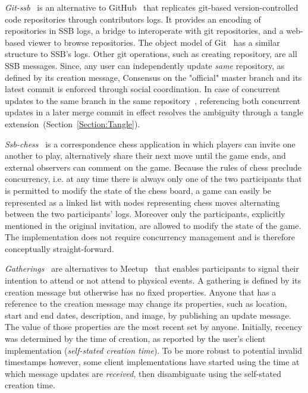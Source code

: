 \documentclass[10pt,sigconf,rewiew]{acmart}
\begin{document}
\textit{Git-ssb}~\cite{git-ssb} is an alternative to GitHub~\cite{github} that
replicates git-based version-controlled code repositories through contributors
logs. It provides an encoding of repositories in SSB logs, a bridge to
interoperate with git repositories, and a web-based viewer to browse
repositories. The object model of Git~\cite{chacon2014pro} has a similar
structure to SSB's logs. Other git operations, such as creating repository, are 
all SSB messages. Since, any user can independently update \textit{same} repository, as defined by its creation message, Consensus on the "official" master branch and its latest commit is enforced
through social coordination. In case of concurrent updates to the same branch
in the same repository~\cite{git-ssb-push-conflict}, referencing both concurrent 
updates in a later merge commit in effect resolves
the ambiguity through a tangle extension~(Section~\ref{Section:Tangle}).

\textit{Ssb-chess}~\cite{ssb-chess} is a correspondence chess application in
which players can invite one another to play, alternatively share their next
move until the game ends, and external observers can comment on the game. 
Because the rules of chess preclude concurrency,  i.e. at any time there is always
 only one of the two participants that is permitted to modify the state of the chess board, 
 a game can easily be represented as a linked list with nodes
representing chess moves alternating between the two participants' logs. 
Moreover only the participants, explicitly mentioned in the original invitation, are
allowed to modify the state of the game. The implementation does not require
concurrency management and is therefore conceptually straight-forward.

\textit{Gatherings}~\cite{patch-gatherings} are alternatives to
Meetup~\cite{meetup.com} that enables participants to signal their intention to
attend or not attend to physical events. A gathering is defined by its creation message 
but otherwise has no fixed properties. Anyone that has a reference to the creation message may
change its properties, such as location, start and end dates, description, and
image, by publishing an update message. The value of those properties are the
most recent set by anyone. Initially, recency was determined by the time of
creation, as reported by the user's client implementation (\textit{self-stated
creation time}). To be more robust to potential invalid
timestamps however, some client implementations have started using the time at
which message updates are \textit{received}, then disambiguate using the
self-stated creation time.
\end{document}
